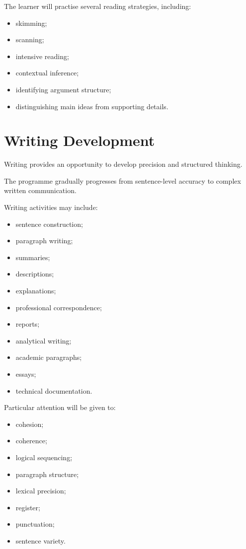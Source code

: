 The learner will practise several reading strategies, including:

\begin{itemize}
    \item skimming;
    \item scanning;
    \item intensive reading;
    \item contextual inference;
    \item identifying argument structure;
    \item distinguishing main ideas from supporting details.
\end{itemize}

\section*{Writing Development}

Writing provides an opportunity to develop precision and structured thinking.

The programme gradually progresses from sentence-level accuracy to complex written communication.

Writing activities may include:

\begin{itemize}
    \item sentence construction;
    \item paragraph writing;
    \item summaries;
    \item descriptions;
    \item explanations;
    \item professional correspondence;
    \item reports;
    \item analytical writing;
    \item academic paragraphs;
    \item essays;
    \item technical documentation.
\end{itemize}

Particular attention will be given to:

\begin{itemize}
    \item cohesion;
    \item coherence;
    \item logical sequencing;
    \item paragraph structure;
    \item lexical precision;
    \item register;
    \item punctuation;
    \item sentence variety.
\end{itemize}

